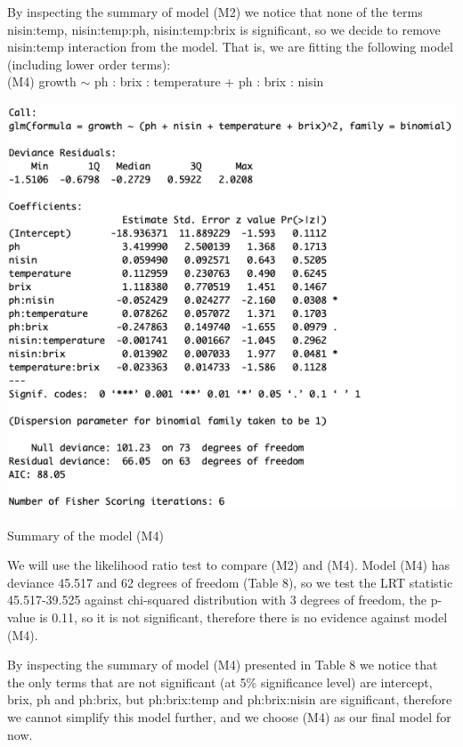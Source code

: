 \documentclass{article}
\begin{document}
By inspecting the summary of model (M2) we notice that none of the terms nisin:temp, nisin:temp:ph, nisin:temp:brix is significant, so we decide to remove nisin:temp interaction from the model. That is, we are fitting the following model  (including lower order terms):
\\(M4)   growth $\sim$ ph : brix : temperature + ph : brix : nisin \\
\begin{table}[h!]
\includegraphics[scale = 0.5]{table8.png}
\caption{Summary of the model (M4) }
\end{table}

We will use the likelihood ratio test to compare (M2) and (M4). Model (M4) has deviance 45.517  and 62  degrees of freedom (Table 8), so we test the LRT statistic 45.517-39.525 against chi-squared distribution with 3 degrees of freedom, the p-value is 0.11, so it is not significant, therefore there is no evidence against model (M4). 

By inspecting the summary of model (M4) presented in Table 8 we notice that the only terms that are not significant (at 5\% significance level) are intercept, brix, ph and ph:brix, but ph:brix:temp and ph:brix:nisin are significant, therefore we cannot simplify this model further, and we choose (M4) as our final model for now. 
\end{document}
